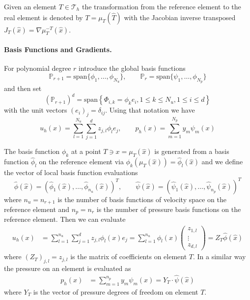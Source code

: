 \documentclass[a4paper,
		     12pt,
		     DIV10,
		     DIVcalc,
		     headings=normal,
		     oneside,
		     bibliography=totoc,
		     headsepline=false,
		     headinclude]{scrartcl}
\theoremstyle{definition}
\begin{document}
Given an element $T\in\mathcal{T}_h$ the transformation from the reference element to the real element is denoted by $T = \mu_T(\hat T)$
with the Jacobian inverse transposed $J_T(\hat x) = \nabla\mu_T^{-T}(\hat x)$.

\paragraph{Basis Functions and Gradients.} For polynomial degree $r$ introduce the global basis functions
\begin{equation}
\mathbb{P}_{r+1}=\text{span}\{ \phi_1,\ldots,\phi_{N_u}\}, \qquad 
\mathbb{P}_{r}=\text{span}\{ \psi_1,\ldots,\phi_{N_p}\}
\end{equation}
and then set
\begin{equation}
(\mathbb{P}_{r+1})^d = \text{span}\left\{ \Phi_{i,k} = \phi_k e_i, 1\leq k \leq N_u, 1\leq i \leq d    \right\}
\end{equation}
with the unit vectors $(e_i)_j=\delta_{ij}$. Using that notation we have
\begin{equation}
u_h(x) = \sum_{l=1}^{N_u} \sum_{j=1}^d z_{j,l} \phi_l e_j, \qquad p_h(x) = \sum_{m=1}^{N_p} y_{m}\psi_m(x)
\end{equation}

The basis function $\phi_k$ at a point $T\ni x = \mu_{T}(\hat x)$
is generated from a basis function $\hat\phi_l$ on the reference element via $\phi_k(\mu_T(\hat x)) = \hat\phi_l(\hat x)$ 
and we define the vector of local basis function evaluations
$$ \hat \phi(\hat x) = \left( \hat\phi_1(\hat x),\ldots,\hat\phi_{n_u}(\hat x) \right)^T, \qquad
\hat\psi(\hat x) =  \left( \hat\psi_1(\hat x),\ldots,\hat\psi_{n_p}(\hat x) \right)^T$$
where $n_u=n_{r+1}$ is the number of basis functions of velocity space on the reference element and
$n_p=n_r$ is the number of pressure basis functions on the reference element.
Then we can evaluate
\begin{equation}
\label{eq:evalu}
\begin{split}
u_h(x) &=  \sum_{l=1}^{n_u} \sum_{j=1}^d z_{j,l}   \phi_l(x) e_j  = \sum_{l=1}^{n_u} \phi_l(x) \left(\begin{array}{c}
z_{1,l}\\ \vdots\\ z_{d,l} \end{array}\right)
= Z_T \hat\phi(\hat x)
\end{split}
\end{equation}
where $(Z_T)_{j,l} = z_{j,l}$ is the matrix of coefficients on element $T$.
In a similar way the pressure on an element is evaluated as
\begin{equation}
\label{eq:evalp}
\begin{split}
p_h(x) &=  \sum_{m=1}^{n_p} y_{m} \psi_m(x) 
= Y_T \cdot \hat\psi(\hat x)
\end{split}
\end{equation}
where $Y_T$ is the vector of pressure degrees of freedom on element $T$.
\end{document}
